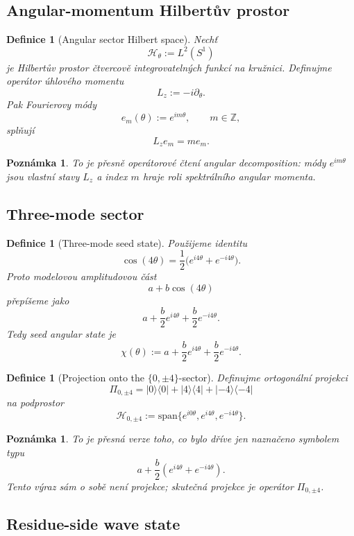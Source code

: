 \documentclass[11pt,a4paper]{article}
\newtheorem{definition}[theorem]{Definice}
\newtheorem{remark}[theorem]{Poznámka}
\begin{document}
\subsection*{Angular-momentum Hilbertův prostor}

\begin{definition}[Angular sector Hilbert space]
Nechť
\[
\mathcal H_\theta:=L^2(S^1)
\]
je Hilbertův prostor čtvercově integrovatelných funkcí na kružnici.
Definujme operátor úhlového momentu
\[
L_z:=-i\partial_\theta.
\]
Pak Fourierovy módy
\[
e_m(\theta):=e^{im\theta},
\qquad m\in\mathbb Z,
\]
splňují
\[
L_z e_m = m e_m.
\]
\end{definition}

\begin{remark}
To je přesně operátorové čtení angular decomposition:
módy \(e^{im\theta}\) jsou vlastní stavy \(L_z\) a index \(m\) hraje roli spektrálního
angular momenta.
\end{remark}

\subsection*{Three-mode sector}

\begin{definition}[Three-mode seed state]
Použijeme identitu
\[
\cos(4\theta)=\frac12\bigl(e^{i4\theta}+e^{-i4\theta}\bigr).
\]
Proto modelovou amplitudovou část
\[
a+b\cos(4\theta)
\]
přepíšeme jako
\[
a+\frac b2 e^{i4\theta}+\frac b2 e^{-i4\theta}.
\]
Tedy seed angular state je
\[
\chi(\theta):=a+\frac b2 e^{i4\theta}+\frac b2 e^{-i4\theta}.
\]
\end{definition}

\begin{definition}[Projection onto the \(\{0,\pm4\}\)-sector]
Definujme ortogonální projekci
\[
\Pi_{0,\pm4}
=
|0\rangle\langle 0|+|4\rangle\langle 4|+|-4\rangle\langle -4|
\]
na podprostor
\[
\mathcal H_{0,\pm4}:=\mathrm{span}\{e^{i0\theta},e^{i4\theta},e^{-i4\theta}\}.
\]
\end{definition}

\begin{remark}
To je přesná verze toho, co bylo dříve jen naznačeno symbolem typu
\[
a+\frac b2(e^{i4\theta}+e^{-i4\theta}).
\]
Tento výraz sám o sobě není projekce; skutečná projekce je operátor \(\Pi_{0,\pm4}\).
\end{remark}

\subsection*{Residue-side wave state}
\end{document}
